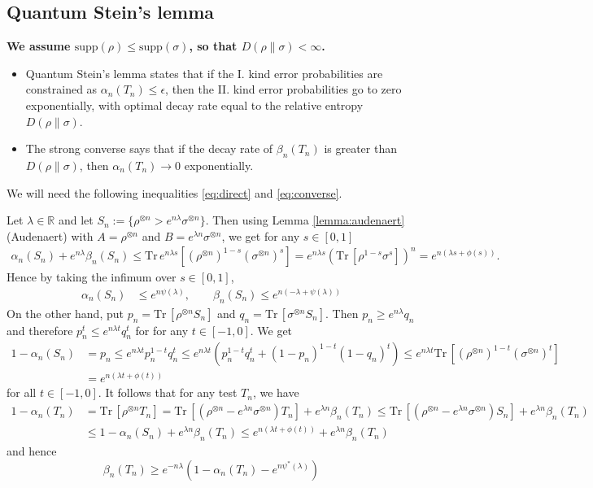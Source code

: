 \documentclass[12pt]{article}
\theoremstyle{definition}
\theoremstyle{remark}
\def \Tr{\mathrm{Tr}\,}
\def\supp{\mathrm{supp}}
\begin{document}
\subsection{Quantum Stein's lemma}


\textbf{We assume $\supp(\rho)\le \supp(\sigma)$, so that $D(\rho\|\sigma)<\infty$.}

\begin{itemize}

\item Quantum Stein's lemma states that if the I. kind error probabilities are constrained as
$\alpha_n(T_n)\le \epsilon$, then the II. kind error probabilities go to zero
exponentially, with optimal decay rate equal to the relative entropy $D(\rho\|\sigma)$. 
\item The strong converse says that if the decay rate of $\beta_n(T_n)$ is greater than
$D(\rho\|\sigma)$, then $\alpha_n(T_n)\to 0$ exponentially.
\end{itemize}


We will need the following inequalities \eqref{eq:direct} and \eqref{eq:converse}.

Let $\lambda\in \mathbb R$ and let $S_n:=\{\rho^{\otimes n}>e^{n\lambda}\sigma^{\otimes
n}\}$. Then using Lemma \ref{lemma:audenaert} (Audenaert) with $A=\rho^{\otimes n}$ and
$B=e^{\lambda n}\sigma^{\otimes n}$, we get  for any $s\in [0,1]$
\begin{align}\label{eq:direct1}
\alpha_n(S_n)+e^{n\lambda}\beta_n(S_n)\le \Tr e^{n\lambda s}[(\rho^{\otimes n})^{1-s}(\sigma^{\otimes
n})^s]=e^{n\lambda s}(\Tr[\rho^{1-s}\sigma^s])^n=e^{n(\lambda s+\phi(s))}.
\end{align}
Hence by taking the infimum over $s\in [0,1]$,
\begin{align}
\alpha_n(S_n)&\le e^{n\psi(\lambda)},\qquad\beta_n(S_n)\le e^{n(-\lambda
+\psi(\lambda))}\label{eq:direct}
\end{align}
On the other hand, put $p_n=\Tr[\rho^{\otimes n}S_n]$ and $q_n=\Tr[\sigma^{\otimes
n}S_n]$. Then $p_n \ge e^{n\lambda}q_n$ and therefore $p_n^t\le e^{n\lambda t}q_n^t$ for 
for any $t\in [-1,0]$. We get
\begin{align*}
1-\alpha_n(S_n)&=p_n\le e^{n\lambda t}p_n^{1-t}q_n^{t}\le e^{n\lambda
t}(p_n^{1-t}q_n^{t}+(1-p_n)^{1-t}(1-q_n)^{t})\le e^{n\lambda t}\Tr[(\rho^{\otimes
n})^{1-t}(\sigma^{\otimes n})^t]\\
&=e^{n(\lambda t+\phi(t))}
\end{align*}
for all $t\in [-1,0]$. It follows that for any test $T_n$, we have
\begin{align*}
1-\alpha_n(T_n)&=\Tr[\rho^{\otimes n} T_n]=\Tr[(\rho^{\otimes n}-e^{\lambda
n}\sigma^{\otimes n})T_n]+e^{\lambda n}\beta_n(T_n)\le \Tr[(\rho^{\otimes n}-e^{\lambda
n}\sigma^{\otimes n})S_n]+e^{\lambda n}\beta_n(T_n)\\
&\le 1-\alpha_n(S_n)+e^{\lambda n}\beta_n(T_n)\le e^{n(\lambda t+\phi(t))}+e^{\lambda n}\beta_n(T_n)
\end{align*}
and hence
\begin{equation}\label{eq:converse}
\beta_n(T_n)\ge e^{-n\lambda}(1-\alpha_n(T_n)-e^{n\psi^*(\lambda)})
\end{equation}
\end{document}
